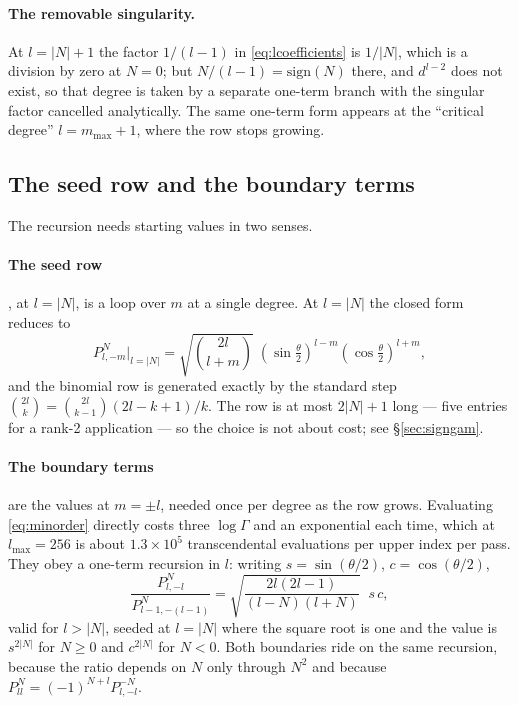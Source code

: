 \documentclass[11pt,a4paper]{article}
\begin{document}
\paragraph{The removable singularity.}  At $l = |N|+1$ the factor $1/(l-1)$
in \eqref{eq:lcoefficients} is $1/|N|$, which is a division by zero at
$N=0$; but $N/(l-1) = \mathrm{sign}(N)$ there, and $d^{l-2}$ does not
exist, so that degree is taken by a separate one-term branch with the
singular factor cancelled analytically.  The same one-term form appears at
the ``critical degree'' $l = m_{\max}+1$, where the row stops growing.

\subsection{The seed row and the boundary terms}

The recursion needs starting values in two senses.

\paragraph{The seed row}, at $l=|N|$, is a loop over $m$ at a single
degree.  At $l=|N|$ the closed form reduces to
\begin{equation}
  P^{N}_{l,-m}\big|_{l=|N|}
    = \sqrt{\binom{2l}{l+m}}\;
      \left(\sin\tfrac{\theta}{2}\right)^{l-m}
      \left(\cos\tfrac{\theta}{2}\right)^{l+m},
  \label{eq:seedrow}
\end{equation}
and the binomial row is generated exactly by the standard step
$\binom{2l}{k} = \binom{2l}{k-1}(2l-k+1)/k$.  The row is at most $2|N|+1$
long --- five entries for a rank-2 application --- so the choice is not
about cost; see \S\ref{sec:signgam}.

\paragraph{The boundary terms} are the values at $m=\pm l$, needed once
per degree as the row grows.  Evaluating \eqref{eq:minorder} directly costs
three $\log\Gamma$ and an exponential each time, which at $l_{\max}=256$
is about $1.3\times10^5$ transcendental evaluations per upper index per
pass.  They obey a one-term recursion in $l$: writing $s=\sin(\theta/2)$,
$c=\cos(\theta/2)$,
\begin{equation}
  \frac{P^{N}_{l,-l}}{P^{N}_{l-1,-(l-1)}}
    = \sqrt{\frac{2l(2l-1)}{(l-N)(l+N)}}\;\; s\,c,
  \label{eq:boundaryrecursion}
\end{equation}
valid for $l > |N|$, seeded at $l=|N|$ where the square root is one and
the value is $s^{2|N|}$ for $N\geq 0$ and $c^{2|N|}$ for $N<0$.  Both
boundaries ride on the same recursion, because the ratio depends on $N$
only through $N^2$ and because $P^N_{ll} = (-1)^{N+l}P^{-N}_{l,-l}$.
\end{document}
